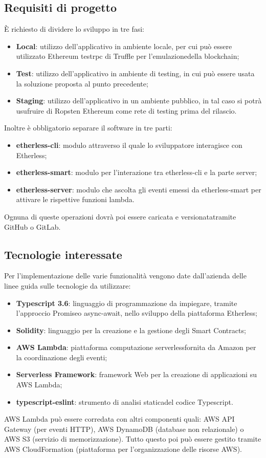 \subsection{Requisiti di progetto}
È richiesto di dividere lo sviluppo in tre fasi:
\begin{itemize}
   	\item \textbf{Local}: utilizzo dell'applicativo in ambiente locale, per cui può essere utilizzato Ethereum testrpc di Truffle per
   	l'emulazione\glosp della blockchain;
   	\item \textbf{Test}: utilizzo dell'applicativo in ambiente di testing, in cui può essere usata la soluzione proposta al punto precedente;
   	\item \textbf{Staging}: utilizzo dell'applicativo in un ambiente pubblico, in tal caso si potrà usufruire di Ropsten Ethereum come rete di testing prima del rilascio.
\end{itemize}
Inoltre è obbligatorio separare il software in tre parti:
\begin{itemize}
   	\item \textbf{etherless-cli}: modulo attraverso il quale lo sviluppatore interagisce con Etherless;
   	\item \textbf{etherless-smart}: modulo per l'interazione tra etherless-cli e la parte server;
   	\item \textbf{etherless-server}: modulo che ascolta gli eventi emessi da etherless-smart per attivare le rispettive funzioni lambda\glo. 
\end{itemize}
Ognuna di queste operazioni dovrà poi essere caricata e versionata\glosp tramite GitHub o GitLab.
\subsection{Tecnologie interessate}
    Per l'implementazione delle varie funzionalità vengono date dall'azienda delle linee guida sulle tecnologie da utilizzare:
    \begin{itemize}
        \item \textbf{Typescript 3.6}: linguaggio di programmazione da impiegare, tramite l'approccio Promise\glosp o async-await\glo, nello sviluppo della piattaforma Etherless;
        \item \textbf{Solidity}: linguaggio per la creazione e la gestione degli Smart Contracts\glo;
        \item \textbf{AWS Lambda}: piattaforma computazione serverless\glosp fornita da Amazon per la coordinazione degli eventi;
        \item \textbf{Serverless Framework}: framework Web per la creazione di applicazioni su AWS Lambda;
        \item \textbf{typescript-eslint}: strumento di analisi statica\glosp del codice Typescript.
    \end{itemize}
    AWS Lambda può essere corredata con altri componenti quali: AWS API Gateway (per eventi HTTP), AWS DynamoDB (database non relazionale)
    o AWS S3 (servizio di memorizzazione). Tutto questo poi può essere gestito tramite AWS CloudFormation (piattaforma per l'organizzazione delle
    risorse AWS).
